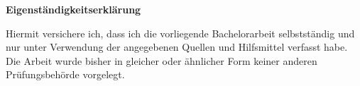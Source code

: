 \documentclass[oneside,11pt,xetex]{scrbook}
\begin{document}
\backmatter


\printbibliography[title=References,heading=bibintoc]

\clearpage

\begin{minipage}{1.0\textwidth}
  \begin{center}
    \vspace{5cm}
    \LARGE \textbf{Eigenständigkeitserklärung}
  \end{center}

  \vspace{2cm}
  \normalsize
Hiermit versichere ich, dass ich die vorliegende Bachelorarbeit selbstständig
und nur unter Verwendung der angegebenen Quellen und Hilfsmittel verfasst habe.
Die Arbeit wurde bisher in gleicher oder ähnlicher Form keiner anderen Prüfungsbehörde
vorgelegt.
  \vspace{1cm}
  \par\noindent\makebox[2.5in]{\hrulefill}     \hfill\makebox[2.0in]{\hrulefill}%
  \par\noindent{} \hfill{}%

\end{minipage}
\end{document}
